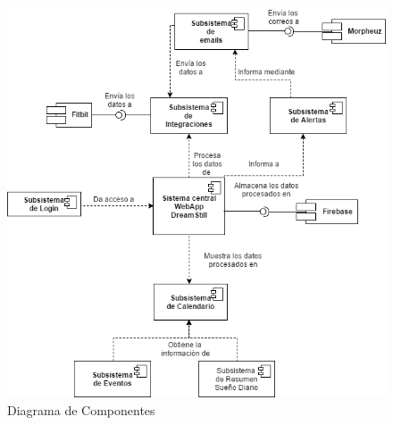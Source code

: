 \documentclass[11pt,openany]{book}
\begin{document}
\begin{figure}[H]
\centering
\includegraphics[totalheight=10cm]{diagramas/Diagrama_de_Componentes.png}
\caption{Diagrama de Componentes}
\end{figure}
\end{document}
